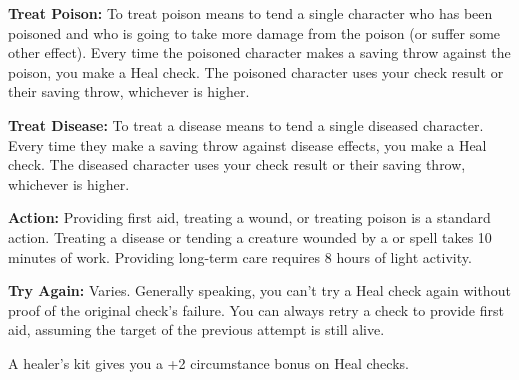 \textbf{Treat Poison:} To treat poison means to tend a single character who has been poisoned and who is going to take more damage from the poison (or suffer some other effect). Every time the poisoned character makes a saving throw against the poison, you make a Heal check. The poisoned character uses your check result or their saving throw, whichever is higher.

\textbf{Treat Disease:} To treat a disease means to tend a single diseased character. Every time they make a saving throw against disease effects, you make a Heal check. The diseased character uses your check result or their saving throw, whichever is higher.

\textbf{Action:} Providing first aid, treating a wound, or treating poison is a standard action. Treating a disease or tending a creature wounded by a  or  spell takes 10 minutes of work. Providing long-term care requires 8 hours of light activity.

\textbf{Try Again:} Varies. Generally speaking, you can't try a Heal check again without proof of the original check's failure. You can always retry a check to provide first aid, assuming the target of the previous attempt is still alive.

A healer's kit gives you a +2 circumstance bonus on Heal checks.

